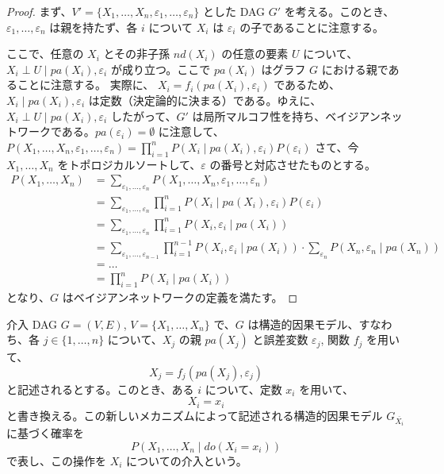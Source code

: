 \documentclass[uplatex, dvipdfmx]{jsarticle}
\begin{document}
\begin{proof}
  まず、$V' = \{X_1, \dots, X_n, \varepsilon_1, \dots, \varepsilon_n\}$ とした DAG $G'$ を考える。このとき、$\varepsilon_1, \dots, \varepsilon_n$ は親を持たず、各 $i$ について $X_i$ は $\varepsilon_i$ の子であることに注意する。

  ここで、任意の $X_i$ とその非子孫 $nd(X_i)$ の任意の要素 $U$ について、
  $ X_i \perp U \mid pa(X_i), \varepsilon_i $
  が成り立つ。ここで $pa(X_i)$ はグラフ $G$ における親であることに注意する。
  実際に、
  $ X_i = f_i(pa(X_i), \varepsilon_i) $
  であるため、$X_i \mid pa(X_i), \varepsilon_i$ は定数（決定論的に決まる）である。ゆえに、
  $ X_i \perp U \mid pa(X_i), \varepsilon_i $
  したがって、$G'$ は局所マルコフ性を持ち、ベイジアンネットワークである。$pa(\varepsilon_i) = \emptyset$ に注意して、
  $ P(X_1, \dots, X_n, \varepsilon_1, \dots, \varepsilon_n) = \prod_{i=1}^n P(X_i \mid pa(X_i), \varepsilon_i) P(\varepsilon_i) $
  さて、今 $X_1, \dots, X_n$ をトポロジカルソートして、$\varepsilon$ の番号と対応させたものとする。
  \begin{align}
    P(X_1, \dots, X_n) &= \sum_{\varepsilon_1, \dots, \varepsilon_n} P(X_1, \dots, X_n, \varepsilon_1, \dots, \varepsilon_n) \\
    &= \sum_{\varepsilon_1, \dots, \varepsilon_n} \prod_{i=1}^n P(X_i \mid pa(X_i), \varepsilon_i) P(\varepsilon_i) \\
    &= \sum_{\varepsilon_1, \dots, \varepsilon_n} \prod_{i=1}^n P(X_i, \varepsilon_i \mid pa(X_i)) \\
    &= \sum_{\varepsilon_1, \dots, \varepsilon_{n-1}} \prod_{i=1}^{n-1} P(X_i, \varepsilon_i \mid pa(X_i)) \cdot \sum_{\varepsilon_n} P(X_n, \varepsilon_n \mid pa(X_n)) \\
    &= \dots \\
    &= \prod_{i=1}^n P(X_i \mid pa(X_i))
  \end{align}
  となり、$G$ はベイジアンネットワークの定義を満たす。
\end{proof}

\begin{defn}{介入}
  DAG $G=(V,E)$, $V=\{X_1, \dots, X_n\}$ で、$G$ は構造的因果モデル、すなわち、各 $j \in \{1, \dots, n\}$ について、$X_j$ の親 $pa(X_j)$ と誤差変数 $\varepsilon_j$, 関数 $f_j$ を用いて、
  \begin{equation}
    X_j = f_j(pa(X_j), \varepsilon_j)
  \end{equation}
  と記述されるとする。このとき、ある $i$ について、定数 $x_i$ を用いて、
  \begin{equation}
    X_i = x_i
  \end{equation}
  と書き換える。この新しいメカニズムによって記述される構造的因果モデル $G_{\overline{X_i}}$ に基づく確率を
  \[
    P(X_1, \dots, X_n \mid do(X_i = x_i))
  \]
  で表し、この操作を $X_i$ についての介入という。
\end{defn}
\end{document}
